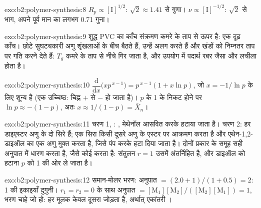 \begin{solution}{exo:b2:polymer-synthesis:8}
$R_p \propto [\mathrm I]^{1/2}$: $\sqrt2 \approx 1.41$ से गुणा। $\nu \propto [\mathrm I]^{-1/2}$:
$\sqrt 2$ से भाग, अपने पूर्व मान का लगभग 0.71 गुना।
\end{solution}

\begin{solution}{exo:b2:polymer-synthesis:9}
शुद्ध PVC का काँच संक्रमण कमरे के ताप से ऊपर है: एक दृढ़ काँच। छोटे सुघट्यकारी
अणु शृंखलाओं के बीच बैठते हैं, उन्हें अलग करते हैं और खंडों को निम्नतर ताप पर गति करने देते हैं: $T_g$
कमरे के ताप से नीचे गिर जाता है, और उपयोग में पदार्थ रबर जैसा और लचीला होता है।
\end{solution}

\begin{solution}{exo:b2:polymer-synthesis:10}
$\dfrac{\mathrm d}{\mathrm dx}\bigl(x p^{\,x-1}\bigr) = p^{\,x-1}(1 + x\ln p)$, जो $x = -1/\ln p$ के लिए शून्य है
(एक उच्चिष्ठ: चिह्न $+$ से $-$ हो जाता है)। $p$ के 1 के निकट होने पर $\ln p \approx -(1-p)$, अतः $x \approx
1/(1-p) = \bar X_n$।
\end{solution}

\begin{solution}{exo:b2:polymer-synthesis:11}
चरण 1, : , मेथेनॉल
आसवित करके हटाया जाता है। चरण 2: हर डाइएस्टर अणु के दो  सिरे हैं; एक सिरा किसी दूसरे अणु के
एस्टर पर आक्रमण करता है और एथेन-1,2-डाइऑल का एक अणु मुक्त करता है, जिसे पंप करके हटा दिया जाता है। 
दोनों प्रकार के समूह सही अनुपात में धारण करता है, जैसे कोई   करता है: संतुलन $r = 1$
उसमें अंतर्निहित है, और डाइऑल को हटाना $p$ को 1 की ओर ले जाता है।
\end{solution}

\begin{solution}{exo:b2:polymer-synthesis:12}
समान-मोलर भरण: अनुपात $= (2.0 + 1)/(1 + 0.5) = 2$:  1 की इकाइयाँ दुगुनी। $r_1 = r_2 =
0$ के साथ अनुपात $= [\mathrm M_1][\mathrm M_2]/([\mathrm M_2][\mathrm M_1]) = 1$, भरण चाहे जो हो: हर
मूलक केवल दूसरा  जोड़ता है, अर्थात् एकांतरी ।
\end{solution}

